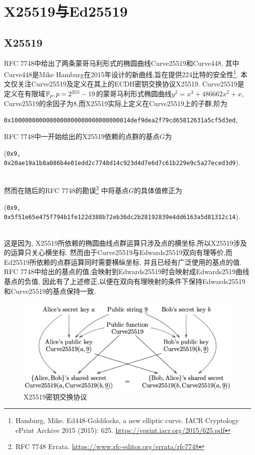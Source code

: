 \section{X25519与Ed25519}

\subsection{X25519}

RFC 7748中给出了两条蒙哥马利形式的椭圆曲线Curve25519和Curve448,
其中Curve448是Mike Hamburg在2015年设计的新曲线,旨在提供224比特的安全性\footnote{
Hamburg, Mike. Ed448-Goldilocks, a new elliptic curve. IACR Cryptology ePrint Archive 2015 (2015): 625.
\url{https://eprint.iacr.org/2015/625.pdf}}.
本文仅关注Curve25519及定义在其上的ECDH密钥交换协议X25519.
Curve25519是定义在有限域$\mathbb{F}_p, p = 2^{255}-19$的蒙哥马利形式椭圆曲线$y^2 = x^3 + 486662x^2 + x$,
Curve25519的余因子为8,而X25519实际上定义在Curve25519上的子群,阶为\\
\centerline{\texttt{0x1000000000000000000000000000000014def9dea2f79cd65812631a5cf5d3ed},}
RFC 7748中一开始给出的X25519依赖的点群的基点$G$为\\
\centerline{(\texttt{0x9, 0x20ae19a1b8a086b4e01edd2c7748d14c923d4d7e6d7c61b229e9c5a27eced3d9}).}\\
然而在随后的RFC 7748的勘误\footnote{
RFC 7748 Errata. \url{https://www.rfc-editor.org/errata/rfc7748}}
中将基点$G$的具体值修正为\\
\centerline{(\texttt{0x9, 0x5f51e65e475f794b1fe122d388b72eb36dc2b28192839e4dd6163a5d81312c14}).}\\
这是因为, X25519所依赖的椭圆曲线点群运算只涉及点的横坐标,所以X25519涉及的运算只关心横坐标.
然而由于Curve25519与Edwards25519双向有理等价,而Ed25519所依赖的点群运算同时需要横纵坐标,
并且已经有广泛使用的基点的值.
RFC 7748中给出的基点的值,会映射到Edwards25519时会映射成Edwards2519曲线基点的负值,
因此有了上述修正,以便在双向有理映射的条件下保持Edwards25519和Curve25519的基点保持一致.

\begin{figure}[h]
\centering
\includegraphics[width=.8\textwidth]{x25519.png}
\caption{X25519密钥交换协议}\label{fig-x25519}
\end{figure}

